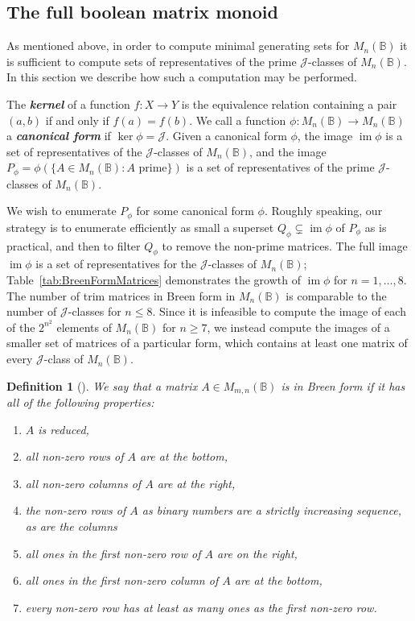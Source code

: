 \documentclass[11pt]{article}
\newtheorem{defi}[thm]{Definition}
\newenvironment{de}[1][]{\begin{defi}[#1]\rm}{\end{defi}}
\newcommand{\defn}[1]{\textbf{\textit{#1}}}
\numberwithin{equation}{section}
\newcommand{\set}[2]{\ensuremath{\{#1 : #2 \}}}
\renewcommand{\to}{\longrightarrow}
\DeclareMathOperator{\im}{im}
\newcommand{\B}{\mathbb{B}}
\newcommand{\Bn}{M_n(\B)}
\newcommand{\Bmn}{M_{m,n}(\B)}
\newcommand{\J}{\mathscr{J}}
\begin{document}
\subsection{The full boolean matrix monoid}
\label{sec:FullBoolMat}
As mentioned above, in order to compute minimal generating sets for $\Bn$ it is
sufficient to compute sets of representatives of the prime $\J$-classes of
$\Bn$. In this section we describe how such a computation may be performed.

The \defn{kernel} of a function $f: X \to Y$ is the equivalence relation
containing a pair $(a, b)$ if and only if $f(a) = f(b)$.
We call a function $\phi: \Bn \to \Bn$ a \defn{canonical form} if
$\ker\phi = \J$. Given a canonical form $\phi$, the image $\im\phi$ is a
set of representatives of the $\J$-classes of $\Bn$, and the image
$P_\phi = \phi(\set{A \in \Bn}{\text{$A$ prime}})$ is a set of
representatives of the prime $\J$-classes of $\Bn$. 

We wish to enumerate $P_\phi$ for some canonical form $\phi$. Roughly speaking,
our strategy is to enumerate efficiently as small a superset $Q_\phi \subsetneq
\im\phi$ of $P_\phi$ as is practical, and then to filter $Q_\phi$ to remove the
non-prime matrices.
The full image $\im\phi$ is a set of representatives for the $\J$-classes of
$\Bn$; Table~\ref{tab:BreenFormMatrices} demonstrates the growth of $\im\phi$ for
$n = 1, \ldots, 8$. The number of trim matrices in Breen form in $\Bn$ is
comparable to the number of $\J$-classes for $n \leq 8$.
Since it is infeasible to compute the image of each of the $2^{n^2}$ elements of
$\Bn$ for $n \geq 7$, we instead compute the images of a smaller set of matrices
of a particular form, which contains at least one matrix of every $\J$-class of
$\Bn$.

\begin{de}[{{\cite[Proposition 3.6]{Breen1997aa}}}]
  We say that a matrix $A \in \Bmn$ is in \emph{Breen form} if it has all of
  the following properties:
  \begin{enumerate}[label={\rm (\roman*)}]
  \item{$A$ is reduced,}
  \item{all non-zero rows of $A$ are at the bottom,}
  \item{all non-zero columns of $A$ are at the right,}
  \item{the non-zero rows of $A$ as binary numbers are a strictly increasing
      sequence, as are the columns}
  \item{all ones in the first non-zero row of $A$ are on the right,}
  \item{all ones in the first non-zero column of $A$ are at the bottom,}
  \item{every non-zero row has at least as many ones as the first non-zero row.}
  \end{enumerate}
\end{de}
\end{document}

